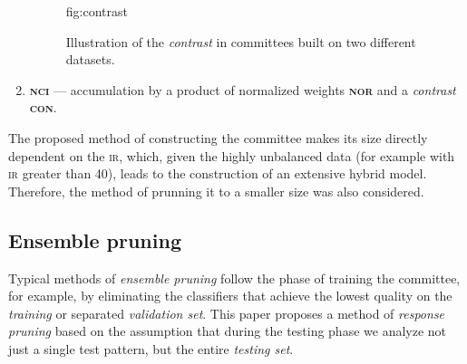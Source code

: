 \documentclass[pmlr]{jmlr}
\begin{document}
\begin{enumerate}
\begin{figure}[!h]
\floatconts
  {fig:contrast}
  {\caption{Illustration of the \emph{contrast} in committees built on two different datasets.}}
  {%
  }
\end{figure}

	
	\item \textbf{\textsc{nci}} --- accumulation by a product of normalized weights \textbf{\textsc{nor}} and a \emph{contrast} \textbf{\textsc{con}}.
\end{enumerate}

The proposed method of constructing the committee makes its size directly dependent on the \textsc{ir}, which, given the highly unbalanced data (for example with \textsc{ir} greater than 40), leads to the construction of an extensive hybrid model. Therefore, the method of prunning it to a smaller size was also considered.

\subsection{Ensemble pruning}

Typical methods of \emph{ensemble pruning} follow the phase of training the committee, for example, by eliminating the classifiers that achieve the lowest quality on the \emph{training} or separated \emph{validation set}. This paper proposes a method of \emph{response pruning} based on the assumption that during the testing phase we analyze not just a single test pattern, but the entire \emph{testing set}.
\end{document}
